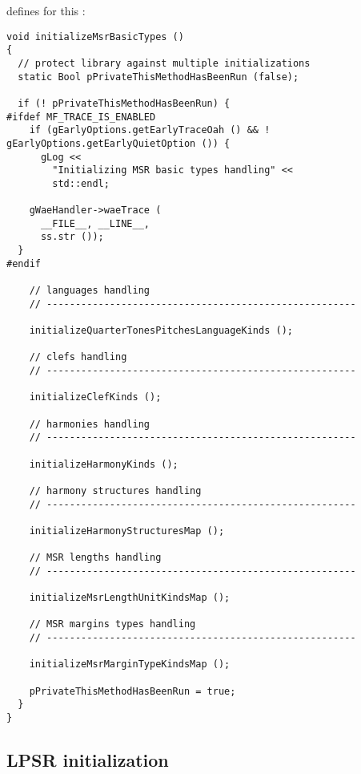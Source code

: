  defines  for this \initialization:
\begin{lstlisting}[language=CPlusPlus]
void initializeMsrBasicTypes ()
{
  // protect library against multiple initializations
  static Bool pPrivateThisMethodHasBeenRun (false);

  if (! pPrivateThisMethodHasBeenRun) {
#ifdef MF_TRACE_IS_ENABLED
    if (gEarlyOptions.getEarlyTraceOah () && ! gEarlyOptions.getEarlyQuietOption ()) {
      gLog <<
        "Initializing MSR basic types handling" <<
        std::endl;

    gWaeHandler->waeTrace (
      __FILE__, __LINE__,
      ss.str ());
  }
#endif

    // languages handling
    // ------------------------------------------------------

    initializeQuarterTonesPitchesLanguageKinds ();

    // clefs handling
    // ------------------------------------------------------

    initializeClefKinds ();

    // harmonies handling
    // ------------------------------------------------------

    initializeHarmonyKinds ();

    // harmony structures handling
    // ------------------------------------------------------

    initializeHarmonyStructuresMap ();

    // MSR lengths handling
    // ------------------------------------------------------

    initializeMsrLengthUnitKindsMap ();

    // MSR margins types handling
    // ------------------------------------------------------

    initializeMsrMarginTypeKindsMap ();

    pPrivateThisMethodHasBeenRun = true;
  }
}
\end{lstlisting}


\subsection{LPSR initialization}


